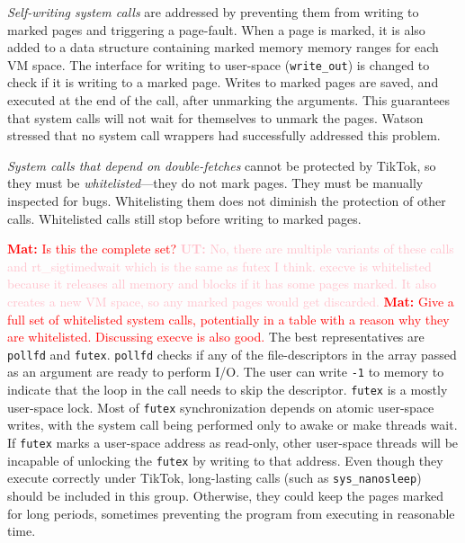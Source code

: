 \documentclass[conference]{IEEEtran}
\newcommand{\uros}[1]{\textcolor{pink}{\textbf{UT:} #1}}
\newcommand{\mat}[1]{\textcolor{red}{\textbf{Mat:} #1}}
\newcommand{\sysname}{TikTok}
\begin{document}
\emph{Self-writing system calls} are addressed by preventing them from writing
to marked pages and triggering a page-fault. When a page is marked, it is also
added to a data structure containing marked memory memory ranges for each VM
space. The interface for writing to user-space (\texttt{write\_out}) is changed
to check if it is writing to a marked page. Writes to marked pages are saved,
and executed at the end of the call, after unmarking the arguments. This
guarantees that system calls will not wait for themselves to unmark the pages.
Watson~\cite{watson2007exploiting} stressed that no system call
wrappers had successfully addressed this problem.

\emph{System calls that depend on double-fetches} cannot be protected by
\sysname{}, so they must be \emph{whitelisted}---they do not mark pages. They
must be manually inspected for bugs. Whitelisting them does not diminish the protection
of other calls. Whitelisted calls still stop before writing to marked pages.

\mat{Is this the complete set?}
\uros{No, there are multiple variants of these calls and rt\_sigtimedwait which is the same as futex I think. execve is whitelisted
because it releases all memory and blocks if it has some pages marked. It also creates a new VM space, so any marked pages would get discarded.}
\mat{Give a full set of whitelisted system calls, potentially in a table with a
reason why they are whitelisted. Discussing execve is also good.}
The best representatives are \texttt{pollfd} and \texttt{futex}. \texttt{pollfd}
checks if any of the file-descriptors in the array passed as an argument are
ready to perform I/O. The user can write \texttt{-1} to memory to indicate that
the loop in the call needs to skip the descriptor. \texttt{futex} is a mostly
user-space lock. Most of \texttt{futex} synchronization depends on atomic
user-space writes, with the system call being performed only to awake or make
threads wait. If \texttt{futex} marks a user-space address as read-only, other
user-space threads will be incapable of unlocking the \texttt{futex} by writing
to that address. Even though they execute correctly under \sysname{},
long-lasting calls (such as \texttt{sys\_nanosleep}) should be included in this
group. Otherwise, they could keep the pages marked for long periods, sometimes
preventing the program from executing in reasonable time.
\end{document}
